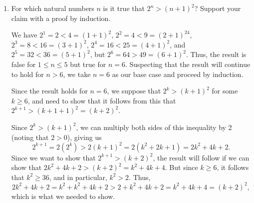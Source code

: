 \documentclass[12pt]{article}
\newcommand{\points}[1]{\marginpar{\hspace{24pt}[#1]}}
\begin{document}
\begin{enumerate}
\vspace{1.5in}

\item For which natural numbers $n$ is it true that $2^n>(n+1)^2$? Support your claim with a proof by induction. \points{5}

\bigskip

We have $2^1=2<4=(1+1)^2$, $2^2=4<9=(2+1)^24$, $2^3 = 8<16 = (3+1)^2$, $2^4 = 16<25 = (4+1)^2$, and $2^5 = 32<36 = (5+1)^2$, but $2^6 = 64>49 = (6+1)^2$. Thus, the result is false for $1\leq n\leq 5$ but true for $n=6$. Suspecting that the result will continue to hold for $n>6$, we take $n=6$ as our base case and proceed by induction.

Since the result holds for $n=6$, we suppose that $2^k>(k+1)^2$ for some $k\geq 6$, and need to show that it follows from this that $2^{k+1}>(k+1+1)^2 = (k+2)^2$.

Since $2^k>(k+1)^2$, we can multiply both sides of this inequality by 2 (noting that $2>0$), giving us
\[
 2^{k+1} = 2(2^k) > 2(k+1)^2 = 2(k^2+2k+1) = 2k^2+4k+2.
\]
Since we want to show that $2^{k+1}>(k+2)^2$, the result will follow if we can show that $2k^2+4k+2>(k+2)^2 = k^2+4k+4$. But since $k\geq 6$, it follows that $k^2\geq 36$, and in particular, $k^2>2$. Thus,
\[
 2k^2+4k+2 = k^2+k^2+4k+2 > 2+k^2+4k+2 = k^2+4k+4 = (k+2)^2,
\]
which is what we needed to show.

\end{enumerate}
\newpage
\end{document}
